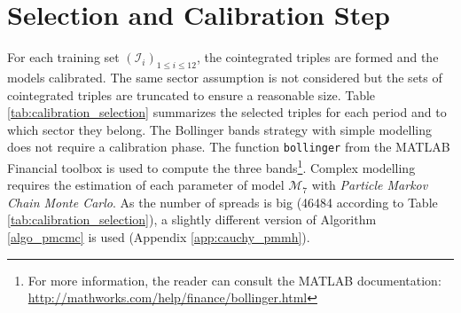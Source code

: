 \documentclass[11pt,a4,twosided,singlespacing,titlepagenumber=on]{scrreprt}
\numberwithin{equation}{chapter} %
\theoremstyle{remark}
\begin{document}
\section{Selection and Calibration Step}
For each training set $(\mathcal{I}_i)_{1 \leq i \leq 12}$, the cointegrated triples are formed and the models calibrated. The same sector assumption is not considered but the sets of cointegrated triples are truncated to ensure a reasonable size. Table \ref{tab:calibration_selection} summarizes the selected triples for each period and to which sector they belong. The Bollinger bands strategy with simple modelling does not require a calibration phase. The function \texttt{bollinger} from the MATLAB Financial toolbox is used to compute the three bands\footnote{For more information, the reader can consult the MATLAB documentation: \url{http://mathworks.com/help/finance/bollinger.html}}. Complex modelling requires the estimation of each parameter of model $\mathcal{M}_7$ with \textit{Particle Markov Chain Monte Carlo}. As the number of spreads is big (46484 according to Table \ref{tab:calibration_selection}), a slightly different version of Algorithm \ref{algo_pmcmc} is used (Appendix \ref{app:cauchy_pmmh}).
\end{document}
